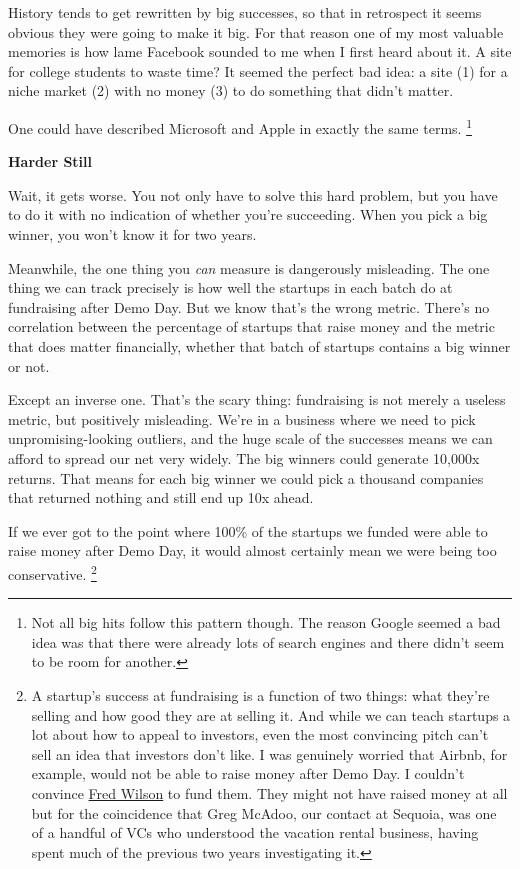 History tends to get rewritten by big successes, so that in retrospect
it seems obvious they were going to make it big. For that reason one of
my most valuable memories is how lame Facebook sounded to me when I
first heard about it. A site for college students to waste time? It
seemed the perfect bad idea: a site (1) for a niche market (2) with no
money (3) to do something that didn't matter.

One could have described Microsoft and Apple in exactly the same terms.
\footnote{Not all big hits follow this pattern though. The reason Google
seemed a bad idea was that there were already lots of search engines and
there didn't seem to be room for another.}

\textbf{Harder Still}

Wait, it gets worse. You not only have to solve this hard problem, but
you have to do it with no indication of whether you're succeeding. When
you pick a big winner, you won't know it for two years.

Meanwhile, the one thing you \emph{can} measure is dangerously
misleading. The one thing we can track precisely is how well the
startups in each batch do at fundraising after Demo Day. But we know
that's the wrong metric. There's no correlation between the percentage
of startups that raise money and the metric that does matter
financially, whether that batch of startups contains a big winner or
not.

Except an inverse one. That's the scary thing: fundraising is not merely
a useless metric, but positively misleading. We're in a business where
we need to pick unpromising-looking outliers, and the huge scale of the
successes means we can afford to spread our net very widely. The big
winners could generate 10,000x returns. That means for each big winner
we could pick a thousand companies that returned nothing and still end
up 10x ahead.

If we ever got to the point where 100\% of the startups we funded were
able to raise money after Demo Day, it would almost certainly mean we
were being too conservative. \footnote{A startup's success at fundraising is a function of two things:
what they're selling and how good they are at selling it. And while we
can teach startups a lot about how to appeal to investors, even the most
convincing pitch can't sell an idea that investors don't like. I was
genuinely worried that Airbnb, for example, would not be able to raise
money after Demo Day. I couldn't convince \href{airbnb.html}{Fred
Wilson} to fund them. They might not have raised money at all but for
the coincidence that Greg McAdoo, our contact at Sequoia, was one of a
handful of VCs who understood the vacation rental business, having spent
much of the previous two years investigating it.}

